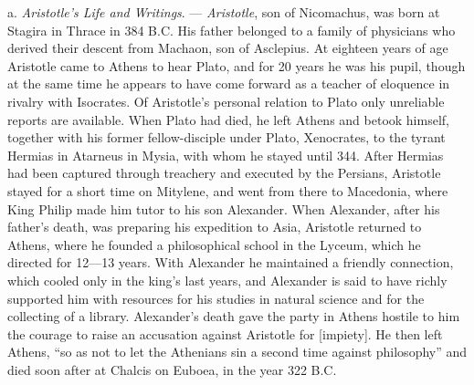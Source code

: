 a. \emph{Aristotle's Life and Writings}. --- \emph{Aristotle},
son of Nicomachus, was born at Stagira in Thrace in 384 B.C.
His father belonged to a family of physicians who derived their
descent from Machaon, son of Asclepius. At eighteen years of age
Aristotle came to Athens to hear Plato, and for 20 years
he was his pupil, though at the same time he appears to
have come forward as a teacher of eloquence in rivalry with
Isocrates. Of Aristotle's personal relation to Plato only
unreliable reports are available. When Plato had died, he left
Athens and betook himself, together with his former fellow-disciple
under Plato, Xenocrates, to the tyrant Hermias in Atarneus
in Mysia, with whom he stayed until 344. After Hermias
had been captured through treachery and executed by the Persians,
Aristotle stayed for a short time on Mitylene, and went from there to
Macedonia, where King Philip made him tutor to his son Alexander. When Alexander, after his father's death, was preparing
his expedition to Asia, Aristotle returned to Athens, where
he founded a philosophical school in the Lyceum, which he directed
for 12---13 years.
With Alexander he maintained a friendly connection, which cooled only in the king's last years,
and Alexander is said to have richly supported him with resources for his studies in natural science and for the collecting
of a library. Alexander's death gave the party in Athens hostile to him
the courage to raise an accusation against Aristotle for
 [impiety]. He then left Athens, ``so as not to let the
Athenians sin a second time against philosophy'' and died soon
after at Chalcis on Euboea, in the year 322 B.C.

